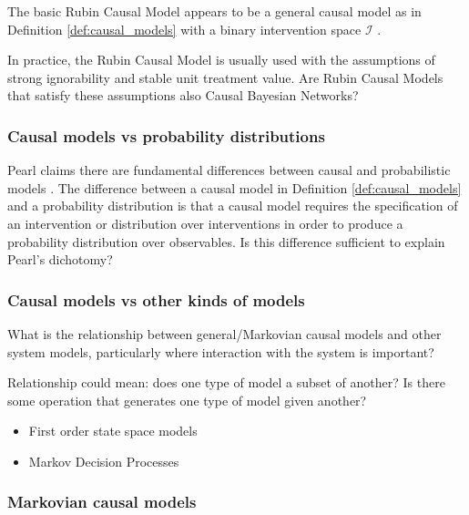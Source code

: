 \begin{question}
    The basic Rubin Causal Model appears to be a general causal model as in Definition \ref{def:causal_models} with a binary intervention space $\mathcal{I}$ \cite{sontag_causal_nodate}. 
    
    In practice, the Rubin Causal Model is usually used with the assumptions of strong ignorability and stable unit treatment value. Are Rubin Causal Models that satisfy these assumptions also Causal Bayesian Networks?
\end{question}

\subsubsection{Causal models vs probability distributions}

\begin{question}
    Pearl claims there are fundamental differences between causal and probabilistic models \cite{pearl_causality:_2009}. The difference between a causal model in Definition \ref{def:causal_models} and a probability distribution is that a causal model requires the specification of an intervention or distribution over interventions in order to produce a probability distribution over observables. Is this difference sufficient to explain Pearl's dichotomy?
\end{question}

\subsubsection{Causal models vs other kinds of models}

\begin{question}
    What is the relationship between general/Markovian causal models and other system models, particularly where interaction with the system is important? 
    
    Relationship could mean: does one type of model a subset of another? Is there some operation that generates one type of model given another?
    \begin{itemize}
        \item First order state space models
        \item Markov Decision Processes
    \end{itemize}
\end{question}

\subsubsection{Markovian causal models}

